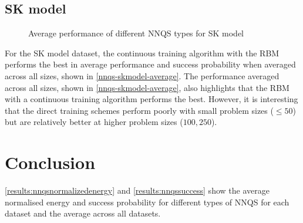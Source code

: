\subsection{SK model}

\begin{figure}[!htbp]
    \centering
    \hfill
    \caption{Average performance of different NNQS types for SK model}
    \label{nnqs-skmodel-average}
\end{figure}

For the SK model dataset, the continuous training algorithm with the RBM performs the best in average performance and success probability when averaged across all sizes, shown in \autoref{nnqs-skmodel-average}. The performance averaged across all sizes, shown in \autoref{nnqs-skmodel-average}, also highlights that the RBM with a continuous training algorithm performs the best. However, it is interesting that the direct training schemes perform poorly with small problem sizes ($\leq 50$) but are relatively better at higher problem sizes ($100, 250$).

\section{Conclusion}
\autoref{results:nnqsnormalizedenergy} and \autoref{results:nnqssuccess} show the average normalised energy and success probability for different types of NNQS for each dataset and the average across all datasets.


